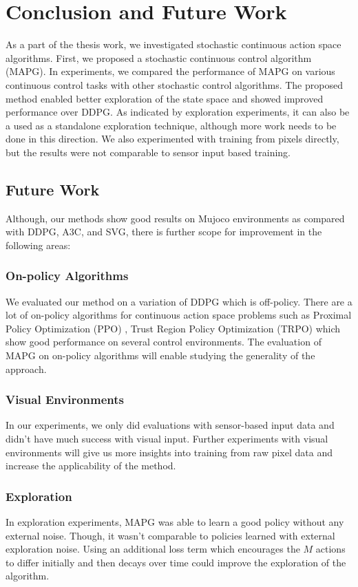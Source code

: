 \chapter{Conclusion and Future Work}\label{chapter:conclusion}
As a part of the thesis work, we investigated stochastic continuous action space algorithms. First, we proposed a stochastic continuous control algorithm (MAPG). In experiments, we compared the performance of MAPG on various continuous control tasks with other stochastic control algorithms. The proposed method enabled better exploration of the state space and showed improved performance over DDPG. As indicated by exploration experiments, it can also be a used as a standalone exploration technique, although more work needs to be done in this direction. We also experimented with training from pixels directly, but the results were not comparable to sensor input based training.

\section{Future Work}
Although, our methods show good results on Mujoco environments as compared with DDPG, A3C, and SVG, there is further scope for improvement in the following areas:

\subsection{On-policy Algorithms}
We evaluated our method on a variation of DDPG which is off-policy. There are a lot of on-policy algorithms for continuous action space problems such as Proximal Policy Optimization (PPO) \cite{SchulmanWDRK17}, Trust Region Policy Optimization (TRPO) which show good performance on several control environments. The evaluation of MAPG on on-policy algorithms will enable studying the generality of the approach.


\subsection{Visual Environments}
In our experiments, we only did evaluations with sensor-based input data and didn't have much success with visual input. Further experiments with visual environments will give us more insights into training from raw pixel data and increase the applicability of the method.

\subsection{Exploration}
In exploration experiments, MAPG was able to learn a good policy without any external noise. Though, it wasn't comparable to policies learned with external exploration noise. Using an additional loss term which encourages the $M$ actions to differ initially and then decays over time could improve the exploration of the algorithm.


